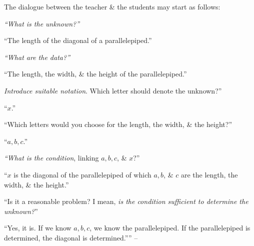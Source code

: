 \documentclass[oneside]{book}
\numberwithin{equation}{section}
\begin{document}
The dialogue between the teacher \& the students may start as follows:

\textit{``What is the unknown?''}

``The length of the diagonal of a parallelepiped.''

\textit{``What are the data?''}

``The length, the width, \& the height of the parallelepiped.''

\textit{Introduce suitable notation}. Which letter should denote the unknown?''

``$x$.''

``Which letters would you choose for the length, the width, \& the height?''

``$a,b,c$.''

\textit{``What is the condition}, linking $a,b,c$, \& $x$?''

``$x$ is the diagonal of the parallelepiped of which $a,b$, \& $c$ are the length, the width, \& the height.''

``Is it a reasonable problem? I mean, \textit{is the condition sufficient to determine the unknown?}''

``Yes, it is. If we know $a,b,c$, we know the parallelepiped. If the parallelepiped is determined, the diagonal is determined.'''' -- \cite[pp. 7--8]{Polya2014}
\end{document}
